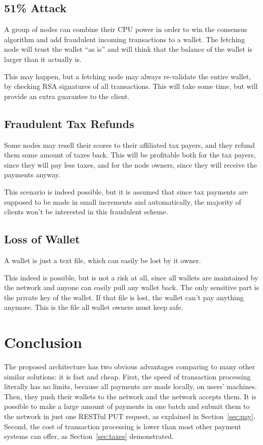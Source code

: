 \documentclass[11pt,oneside]{article}
\begin{document}
\subsection{51\% Attack}

A group of nodes can combine their CPU power in order to win the consensus
algorithm and add fraudulent incoming transactions to a wallet.
The fetching node will trust the wallet ``as is'' and will think that the
balance of the wallet is larger than it actually is.

This may happen, but a fetching node may always re-validate the entire wallet,
by checking RSA signatures of all transactions. This will take some time, but will
provide an extra guarantee to the client.

\subsection{Fraudulent Tax Refunds}

Some nodes may resell their scores to their affiliated tax payers, and they
refund them some amount of taxes back. This will be profitable both for
the tax payers, since they will pay less taxes, and for the node owners,
since they will receive the payments anyway.

This scenario is indeed possible, but it is assumed that since tax payments are
supposed to be made in small increments and automatically, the majority of
clients won't be interested in this fraudulent scheme.

\subsection{Loss of Wallet}

A wallet is just a text file, which can easily be lost by it owner.

This indeed is possible, but is not a risk at all, since all wallets are
maintained by the network and anyone can easily pull any wallet back.
The only sensitive part is the private key of the wallet. If that file
is lost, the wallet can't pay anything anymore. This is the file all
wallet owners must keep safe.

\section{Conclusion}

The proposed architecture has two obvious advantages comparing to many other
similar solutions: it is fast and cheap. First, the speed of transaction processing
literally has no limits, because all payments are made locally, on users'
machines. Then, they push their wallets to the network and the network accepts
them. It is possible to make a large amount of payments in one batch and
submit them to the network in just one RESTful PUT request, as explained
in Section~\ref{sec:pay}. Second, the cost of transaction processing
is lower than most other payment systems can offer, as Section~\ref{sec:taxes}
demonstrated.
\end{document}
